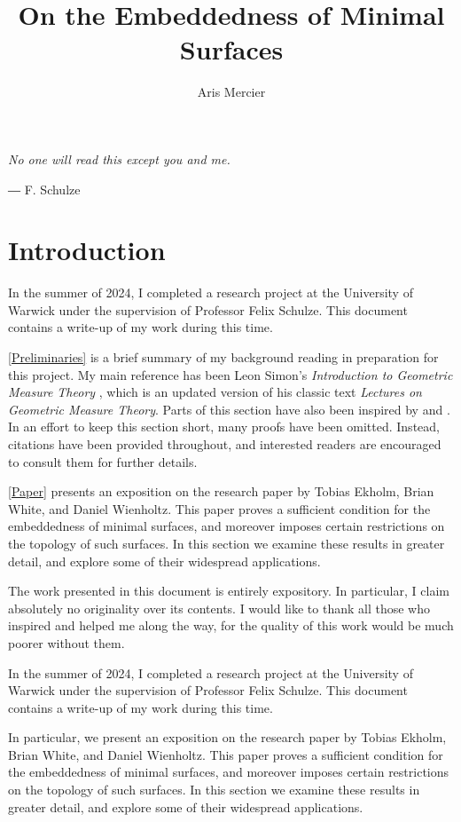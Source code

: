 \documentclass[a4paper, 11pt]{article}
\title{On the Embeddedness of Minimal Surfaces}
\author{Aris Mercier}
\date{}
\theoremstyle{plain}
\theoremstyle{definition}
\theoremstyle{remark}
\numberwithin{equation}{subsection}
\begin{document}
\maketitle
\tableofcontents
\newpage

\epigraph{\emph{No one will read this except you and me.}}{― F. Schulze}
\section{Introduction}

In the summer of 2024, I completed a research project at the University of Warwick under the supervision of Professor Felix Schulze. This document contains a write-up of my work during this time.


\cref{Preliminaries} is a brief summary of my background reading in preparation for this project. My main reference has been Leon Simon's \emph{Introduction to Geometric Measure Theory} \cite{Sim18}, which is an updated version of his classic text \emph{Lectures on Geometric Measure Theory}. Parts of this section have also been inspired by \cite{Rin22} and \cite{Mor16}. In an effort to keep this section short, many proofs have been omitted. Instead, citations have been provided throughout, and interested readers are encouraged to consult them for further details.

\cref{Paper} presents an exposition on the research paper \cite{EWW02} by Tobias Ekholm, Brian White, and Daniel Wienholtz. This paper proves a sufficient condition for the embeddedness of minimal surfaces, and moreover imposes certain restrictions on the topology of such surfaces. In this section we examine these results in greater detail, and explore some of their widespread applications.

The work presented in this document is entirely expository. In particular, I claim absolutely no originality over its contents. I would like to thank all those who inspired and helped me along the way, for the quality of this work would be much poorer without them.

In the summer of 2024, I completed a research project at the University of Warwick under the supervision of Professor Felix Schulze. This document contains a write-up of my work during this time.

In particular, we present an exposition on the research paper \cite{EWW02} by Tobias Ekholm, Brian White, and Daniel Wienholtz. This paper proves a sufficient condition for the embeddedness of minimal surfaces, and moreover imposes certain restrictions on the topology of such surfaces. In this section we examine these results in greater detail, and explore some of their widespread applications.
\end{document}
